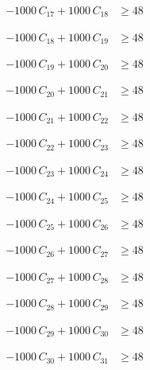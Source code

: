 \documentclass[a4paper,11pt]{article}
\begin{document}
\begin{align}
-1000\,C_{17} + 1000\,C_{18} &\geq 48 \nonumber
\end{align}

\begin{align}
-1000\,C_{18} + 1000\,C_{19} &\geq 48 \nonumber
\end{align}

\begin{align}
-1000\,C_{19} + 1000\,C_{20} &\geq 48 \nonumber
\end{align}

\begin{align}
-1000\,C_{20} + 1000\,C_{21} &\geq 48 \nonumber
\end{align}

\begin{align}
-1000\,C_{21} + 1000\,C_{22} &\geq 48 \nonumber
\end{align}

\begin{align}
-1000\,C_{22} + 1000\,C_{23} &\geq 48 \nonumber
\end{align}

\begin{align}
-1000\,C_{23} + 1000\,C_{24} &\geq 48 \nonumber
\end{align}

\begin{align}
-1000\,C_{24} + 1000\,C_{25} &\geq 48 \nonumber
\end{align}

\begin{align}
-1000\,C_{25} + 1000\,C_{26} &\geq 48 \nonumber
\end{align}

\begin{align}
-1000\,C_{26} + 1000\,C_{27} &\geq 48 \nonumber
\end{align}

\begin{align}
-1000\,C_{27} + 1000\,C_{28} &\geq 48 \nonumber
\end{align}

\begin{align}
-1000\,C_{28} + 1000\,C_{29} &\geq 48 \nonumber
\end{align}

\begin{align}
-1000\,C_{29} + 1000\,C_{30} &\geq 48 \nonumber
\end{align}

\begin{align}
-1000\,C_{30} + 1000\,C_{31} &\geq 48 \nonumber
\end{align}
\end{document}
